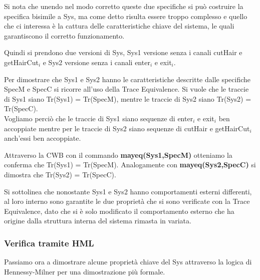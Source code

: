 Si nota che unendo nel modo corretto queste due specifiche si può costruire la specifica bisimile a \textsf{Sys}, ma come detto risulta essere troppo complesso e quello che ci interessa è la cattura delle caratteristiche chiave del sistema, le quali garantiscono il corretto funzionamento.

Quindi si prendono due versioni di \textsf{Sys}, \textsf{Sys1} versione senza i canali \textsf{cutHair} e \textsf{getHairCut$_{i}$} e \textsf{Sys2} versione senza i canali \textsf{enter$_{i}$} e \textsf{exit$_{i}$}.

Per dimostrare che \textsf{Sys1} e \textsf{Sys2} hanno le caratteristiche descritte dalle specifiche \textsf{SpecM} e \textsf{SpecC} si ricorre all'uso della Trace Equivalence. Si vuole che le traccie di \textsf{Sys1} siano\textsf{ Tr(Sys1) = Tr(SpecM)}, mentre le traccie di \textsf{Sys2} siano \textsf{Tr(Sys2) = Tr(SpecC)}. \\
Vogliamo perciò che le traccie di \textsf{Sys1} siano sequenze di \textsf{enter$_{i}$} e \textsf{exit$_{i}$} ben accoppiate mentre per le traccie di \textsf{Sys2} siano sequenze di \textsf{cutHair} e \textsf{getHairCut$_{i}$} anch'essi ben accoppiate.

Attraverso la CWB con il commando \textbf{mayeq(Sys1,SpecM)} otteniamo la conferma che \textsf{Tr(Sys1) = Tr(SpecM)}. Analogamente con \textbf{mayeq(Sys2,SpecC)} si dimostra che \textsf{Tr(Sys2) = Tr(SpecC)}.

Si sottolinea che nonostante \textsf{Sys1} e \textsf{Sys2} hanno comportamenti esterni differenti, al loro interno sono garantite le due proprietà che si sono verificate con la Trace Equivalence, dato che si è solo modificato il comportamento esterno che ha origine dalla struttura interna del sistema rimasta in variata.

\subsubsection{Verifica tramite HML}

Passiamo ora a dimostrare alcune proprietà chiave del \textsf{Sys} attraverso la logica di Hennessy-Milner per una dimostrazione più formale.

